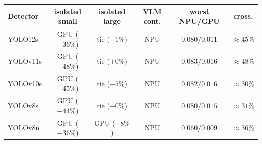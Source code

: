 \begin{tabular}{lccccc}
\toprule
Detector & isolated small & isolated large & VLM cont. & worst NPU/GPU & cross. \\
\midrule
YOLO12s  & GPU ($-36\%$) & tie ($-1\%$) & NPU & $0.080/0.011$ & $\approx45\%$ \\
YOLOv11s & GPU ($-48\%$) & tie ($+0\%$) & NPU & $0.083/0.016$ & $\approx48\%$ \\
YOLOv10s & GPU ($-45\%$) & tie ($-5\%$) & NPU & $0.082/0.016$ & $\approx30\%$ \\
YOLOv8s  & GPU ($-44\%$) & tie ($-0\%$) & NPU & $0.080/0.015$ & $\approx31\%$ \\
YOLOv8n  & GPU ($-36\%$) & GPU ($-8\%$) & NPU & $0.060/0.009$ & $\approx36\%$ \\
\bottomrule
\end{tabular}
